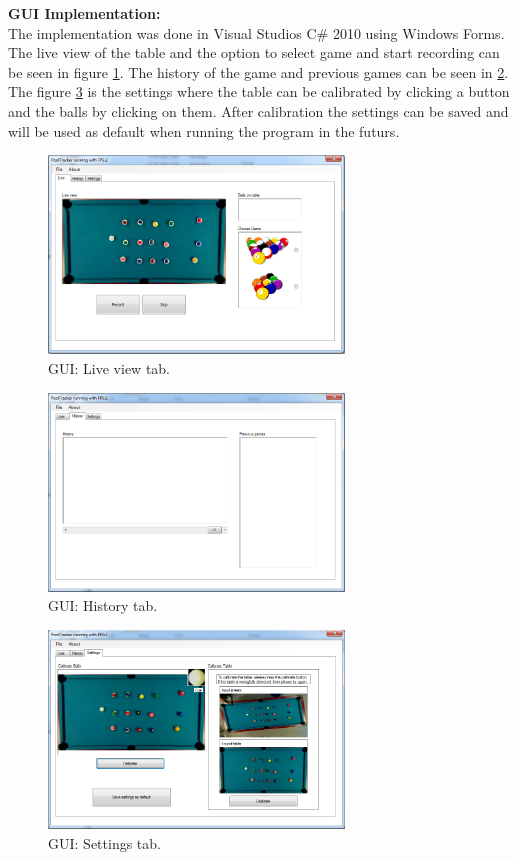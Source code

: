 \textbf{GUI Implementation:}\\
The implementation was done in Visual Studios C\# 2010 using Windows Forms. The live view of the table and the option to select game and start recording can be seen in figure \ref{fig:guilive}. The history of the game and previous games can be seen in \ref{fig:guihist}. The figure \ref{fig:guisett} is the settings where the table can be calibrated by clicking a button and the balls by clicking on them. After calibration the settings can be saved and will be used as default when running the program in the futurs.

\begin{figure}[H]
\begin{center}
\leavevmode
\includegraphics[width=0.7\textwidth]{images/prototype/live}
\end{center}
\caption{GUI: Live view tab.}
\label{fig:guilive}
\end{figure}

\begin{figure}[H]
\begin{center}
\leavevmode
\includegraphics[width=0.7\textwidth]{images/prototype/hist}
\end{center}
\caption{GUI: History tab.}
\label{fig:guihist}
\end{figure}

\begin{figure}[H]
\begin{center}
\leavevmode
\includegraphics[width=0.7\textwidth]{images/prototype/settings}
\end{center}
\caption{GUI: Settings tab.}
\label{fig:guisett}
\end{figure}